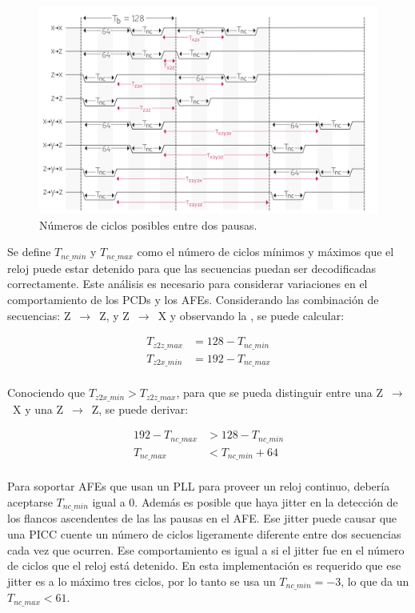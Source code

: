 \documentclass[a4paper, twoside, 11pt]{report}
\begin{document}
\begin{figure}[htb]
  \centering
  \includegraphics[width=1.0\textwidth]{./img/rx_timings}
  \caption{Números de ciclos posibles entre dos pausas.}
  \label{fig:rx_timings}
\end{figure}

Se define $T_{nc\_min}$ y $T_{nc\_max}$ como el número de ciclos mínimos y máximos que el reloj puede estar detenido para que las secuencias puedan ser decodificadas correctamente. Este análisis es necesario para considerar variaciones en el comportamiento de los PCDs y los AFEs. Considerando las combinación de secuencias: Z~$\rightarrow$~Z, y Z~$\rightarrow$~X y observando la , se puede calcular:

\begin{align*}
    T_{z2z\_max} &= 128 - T_{nc\_min} \\
    T_{z2x\_min} &= 192 - T_{nc\_max} \\
\end{align*}

Conociendo que $T_{z2x\_min} > T_{z2z\_max}$, para que se pueda distinguir entre una Z~$\rightarrow$~X y una Z~$\rightarrow$~Z, se puede derivar:

\begin{align*}
    192 - T_{nc\_max} &> 128 - T_{nc\_min} \\
    T_{nc\_max} &< T_{nc\_min} + 64 \\
\end{align*}

Para soportar AFEs que usan un PLL para proveer un reloj continuo, debería aceptarse $T_{nc\_min}$ igual a 0. Además es posible que haya jitter en la detección de los flancos ascendentes de las las pausas en el AFE. Ese jitter puede causar que una PICC cuente un número de ciclos ligeramente diferente entre dos secuencias cada vez que ocurren. Ese comportamiento es igual a si el jitter fue en el número de ciclos que el reloj está detenido. En esta implementación es requerido que ese jitter es a lo máximo tres ciclos, por lo tanto se usa un $T_{nc\_min} = -3$, lo que da un $T_{nc\_max} < 61$.
\end{document}
